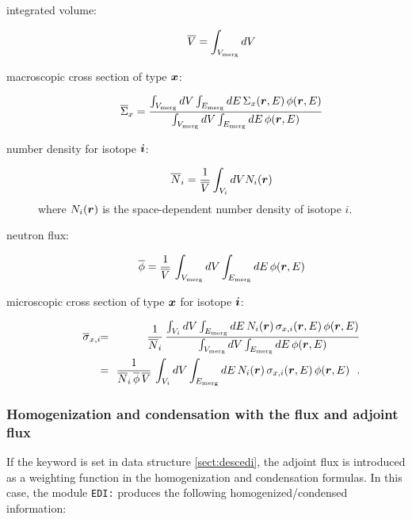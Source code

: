 \begin{description}
\item[integrated volume:]
$$
\overline V=\int_{V_{\rm merg}} dV
$$

\item[macroscopic cross section of type $\bff(x)$:]
$$
\overline \Sigma_x = {\int_{V_{\rm merg}} dV \int_{E_{\rm merg}} dE \, \Sigma_x(\bff(r),E) \, \phi(\bff(r),E)
\over \int_{V_{\rm merg}} dV \int_{E_{\rm merg}} dE \, \phi(\bff(r),E)}
$$

\item[number density for isotope $\bff(i)$:]
$$
\overline N_i= {1\over \overline V} \int_{V_i} dV N_i(\bff(r))
$$
\noindent where $N_i(\bff(r))$ is the space-dependent number density of isotope $i$.

\item[neutron flux:]
$$
\overline\phi = {1\over \overline V} \, \int_{V_{\rm merg}} dV \int_{E_{\rm merg}} dE \, \phi(\bff(r),E)
$$

\item[microscopic cross section of type $\bff(x)$ for isotope $\bff(i)$:]
\begin{eqnarray*}
\overline \sigma_{x,i} \negthinspace\negthinspace &=& \negthinspace\negthinspace { 1 \over \overline N_i} \, {\int_{V_i} dV \int_{E_{\rm merg}} dE \, N_i(\bff(r)) \, \sigma_{x,i}(\bff(r),E) \, \phi(\bff(r),E)
\over \int_{V_{\rm merg}} dV \int_{E_{\rm merg}} dE \, \phi(\bff(r),E)} \\
&=& \negthinspace\negthinspace { 1 \over \overline N_i\, \overline\phi \, \overline V} \, \int_{V_i} dV \int_{E_{\rm merg}} dE \, N_i(\bff(r)) \, \sigma_{x,i}(\bff(r),E) \, \phi(\bff(r),E) \ \ .
\end{eqnarray*}
\end{description}

\subsubsection{Homogenization and condensation with the flux and adjoint flux}\label{sect:prod}

If the  keyword is set in data structure \ref{sect:descedi}, the adjoint flux is introduced as a weighting function in the
homogenization and condensation formulas. In this case, the module {\tt EDI:} produces the following homogenized/condensed information:

